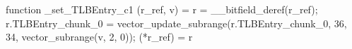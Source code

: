 function _set_TLBEntry_c1 (r_ref, v) = {
    r = __bitfield_deref(r_ref);
    r.TLBEntry_chunk_0 = vector_update_subrange(r.TLBEntry_chunk_0, 36, 34, vector_subrange(v, 2, 0));
    (*r_ref) = r
}
